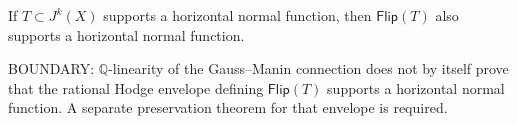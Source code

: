 \begin{conjecture}
If $T \subset J^k(X)$ supports a horizontal normal function, then
$\mathsf{Flip}(T)$ also supports a horizontal normal function.
\end{conjecture}

\noindent
BOUNDARY: $\mathbb{Q}$-linearity of the Gauss--Manin connection does not by
itself prove that the rational Hodge envelope defining
$\mathsf{Flip}(T)$ supports a horizontal normal function.  A separate
preservation theorem for that envelope is required.

